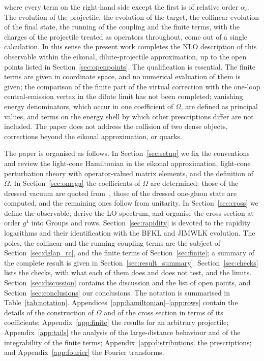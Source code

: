 where every term on the right-hand side except the first is of relative order $\alpha_s$. The evolution of the projectile, the evolution of the target, the collinear evolution of the final state, the running of the coupling and the finite terms, with the charges of the projectile treated as operators throughout, come out of a single calculation. In this sense the present work completes the NLO description of this observable within the eikonal, dilute-projectile approximation, up to the open points listed in Section~\ref{sec:openpoints}. The qualification is essential. The finite terms are given in coordinate space, and no numerical evaluation of them is given; the comparison of the finite part of the virtual correction with the one-loop central-emission vertex in the dilute limit has not been completed; vanishing energy denominators, which occur in one coefficient of $\Omega$, are defined as principal values, and terms on the energy shell by which other prescriptions differ are not included. The paper does not address the collision of two dense objects, corrections beyond the eikonal approximation, or quarks.

The paper is organised as follows. In Section~\ref{sec:setup} we fix the conventions and review the light-cone Hamiltonian in the eikonal approximation, light-cone perturbation theory with operator-valued matrix elements, and the definition of $\Omega$. In Section~\ref{sec:omega} the coefficients of $\Omega$ are determined: those of the dressed vacuum are quoted from~\cite{Lublinsky:2016meo}, those of the dressed one-gluon state are computed, and the remaining ones follow from unitarity. In Section~\ref{sec:cross} we define the observable, derive the LO spectrum, and organise the cross section at order $g^4$ into Groups and rows. Section~\ref{sec:rapidity} is devoted to the rapidity logarithms and their identification with the BFKL and JIMWLK evolution. The poles, the collinear and the running-coupling terms are the subject of Section~\ref{sec:dglap_rc}, and the finite terms of Section~\ref{sec:finite}; a summary of the complete result is given in Section~\ref{sec:result_summary}. Section~\ref{sec:checks} lists the checks, with what each of them does and does not test, and the limits. Section~\ref{sec:discussion} contains the discussion and the list of open points, and Section~\ref{sec:conclusions} our conclusions. The notation is summarised in Table~\ref{tab:notation}. Appendices~\ref{app:hamiltonian}--\ref{app:rows} contain the details of the construction of $\Omega$ and of the cross section in terms of its coefficients; Appendix~\ref{app:finite} the results for an arbitrary projectile; Appendix~\ref{app:tails} the analysis of the large-distance behaviour and of the integrability of the finite terms; Appendix~\ref{app:distributions} the prescriptions; and Appendix~\ref{app:fourier} the Fourier transforms.

